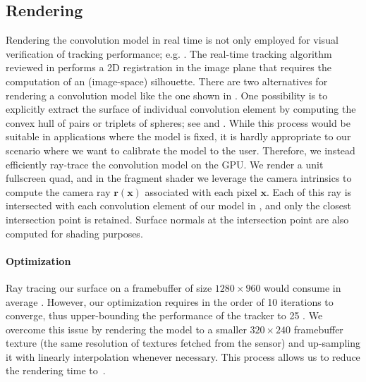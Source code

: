 \subsection{Rendering}
Rendering the convolution model in real time is not only employed for visual verification of tracking performance; e.g. . The real-time tracking algorithm reviewed in  performs a 2D registration in the image plane that requires the computation of an (image-space) silhouette. There are two alternatives for rendering a  convolution model like the one shown in . One possibility is to explicitly extract the surface of individual convolution element by computing the convex hull of pairs or triplets of spheres; see  and \cite{ando2013liquid}. While this process would be suitable in applications where the model is fixed, it is hardly appropriate to our scenario where we want to calibrate the model to the user. Therefore, we instead efficiently ray-trace the convolution model on the GPU. We render a unit fullscreen quad, and in the fragment shader we leverage the camera intrinsics to compute the camera ray $\mathbf{r}(\mathbf{x})$ associated with each pixel $\mathbf{x}$. Each of this ray is intersected with each convolution element of our model in , and only the closest intersection point is retained.  Surface normals at the intersection point are also computed for shading purposes.



\paragraph{Optimization}
Ray tracing our surface on a framebuffer of size $1280 \times 960$ would consume in average . However, our optimization requires in the order of 10 iterations to converge, thus upper-bounding the performance of the tracker to 25 \FPS{}. We overcome this issue by rendering the model to a smaller $320 \times 240$ framebuffer texture (the same resolution of textures fetched from the sensor) and up-sampling it with linearly interpolation whenever necessary. This process allows us to reduce the rendering time to~.




